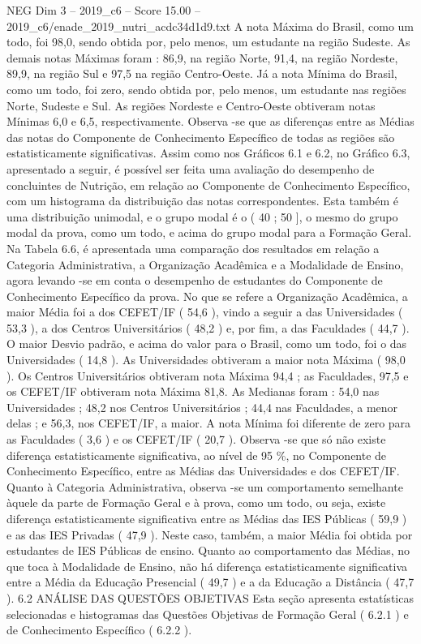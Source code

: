 \begin{textsample}{NEG Dim 3 – 2019\_c6 – Score 15.00 – 2019\_c6/enade\_2019\_nutri\_acdc34d1d9.txt}
A nota Máxima do Brasil, como um todo, foi 98,0, sendo obtida por, pelo menos, um estudante na região Sudeste.
As demais notas Máximas foram : 86,9, na região Norte, 91,4, na região Nordeste, 89,9, na região Sul e 97,5 na região Centro-Oeste.
Já a nota Mínima do Brasil, como um todo, foi zero, sendo obtida por, pelo menos, um estudante nas regiões Norte, Sudeste e Sul.
As regiões Nordeste e Centro-Oeste obtiveram notas Mínimas 6,0 e 6,5, respectivamente.
Observa -se que as diferenças entre as Médias das notas do Componente de Conhecimento Específico de todas as regiões são estatisticamente significativas.
Assim como nos Gráficos 6.1 e 6.2, no Gráfico 6.3, apresentado a seguir, é possível ser feita uma avaliação do desempenho de concluintes de Nutrição, em relação ao Componente de Conhecimento Específico, com um histograma da distribuição das notas correspondentes.
Esta também é uma distribuição unimodal, e o grupo modal é o ( 40 ; 50 ], o mesmo do grupo modal da prova, como um todo, e acima do grupo modal para a Formação Geral.
Na Tabela 6.6, é apresentada uma comparação dos resultados em relação a Categoria Administrativa, a Organização Acadêmica e a Modalidade de Ensino, agora levando -se em conta o desempenho de estudantes do Componente de Conhecimento Específico da prova.
No que se refere a Organização Acadêmica, a maior Média foi a dos CEFET/IF ( 54,6 ), vindo a seguir a das Universidades ( 53,3 ), a dos Centros Universitários ( 48,2 ) e, por fim, a das Faculdades ( 44,7 ).
O maior Desvio padrão, e acima do valor para o Brasil, como um todo, foi o das Universidades ( 14,8 ).
As Universidades obtiveram a maior nota Máxima ( 98,0 ).
Os Centros Universitários obtiveram nota Máxima 94,4 ; as Faculdades, 97,5 e os CEFET/IF obtiveram nota Máxima 81,8.
As Medianas foram : 54,0 nas Universidades ; 48,2 nos Centros Universitários ; 44,4 nas Faculdades, a menor delas ; e 56,3, nos CEFET/IF, a maior.
A nota Mínima foi diferente de zero para as Faculdades ( 3,6 ) e os CEFET/IF ( 20,7 ).
Observa -se que só não existe diferença estatisticamente significativa, ao nível de 95 \%, no Componente de Conhecimento Específico, entre as Médias das Universidades e dos CEFET/IF.
Quanto à Categoria Administrativa, observa -se um comportamento semelhante àquele da parte de Formação Geral e à prova, como um todo, ou seja, existe diferença estatisticamente significativa entre as Médias das IES Públicas ( 59,9 ) e as das IES Privadas ( 47,9 ).
Neste caso, também, a maior Média foi obtida por estudantes de IES Públicas de ensino.
Quanto ao comportamento das Médias, no que toca à Modalidade de Ensino, não há diferença estatisticamente significativa entre a Média da Educação Presencial ( 49,7 ) e a da Educação a Distância ( 47,7 ). 6.2 ANÁLISE DAS QUESTÕES OBJETIVAS Esta seção apresenta estatísticas selecionadas e histogramas das Questões Objetivas de Formação Geral ( 6.2.1 ) e de Conhecimento Específico ( 6.2.2 ).

\end{textsample}
